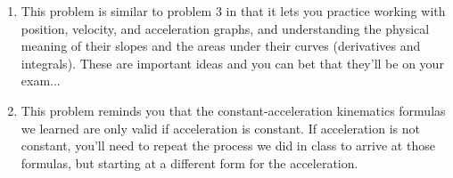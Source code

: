 \documentclass[12pt]{article}
\begin{document}
\begin{enumerate}
\item{This problem is similar to problem 3 in that it lets you practice working with position, velocity, and acceleration graphs, and 
understanding the physical meaning of their slopes and the areas under their curves (derivatives and integrals). These are important
ideas and you can bet that they'll be on your exam...}

\item{This problem reminds you that the constant-acceleration kinematics formulas we learned are only valid if acceleration is constant.
If acceleration is not constant, you'll need to repeat the process we did in class to arrive at those formulas, but starting 
at a different form for the acceleration.}

\end{enumerate}
\end{document}
